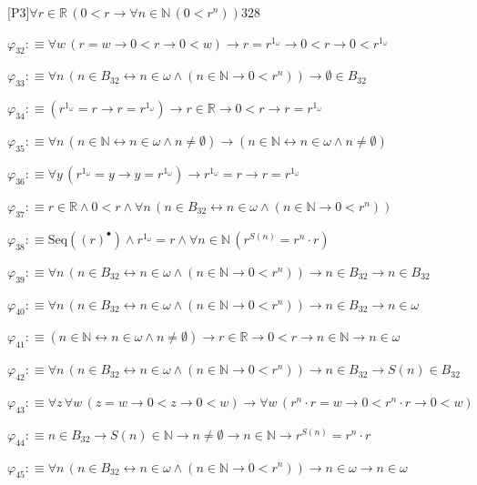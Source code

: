 \begin{fullproof}{[P3]}{$\forall r \in \mathbb{R}\,(0 < r \to \forall n \in \mathbb{N}\,(0 < {{r}^{n}}))$}{328}
\begin{abbrevlist}
\item $\varphi_{32} :\equiv \forall w\,(r = w \to 0 < r \to 0 < w) \to r = {{r}^{1_{\omega}}} \to 0 < r \to 0 < {{r}^{1_{\omega}}}$
\item $\varphi_{33} :\equiv \forall n\,(n \in B_{32} \leftrightarrow n \in \omega \land (n \in \mathbb{N} \to 0 < {{r}^{n}})) \to \emptyset \in B_{32}$
\item $\varphi_{34} :\equiv ({{r}^{1_{\omega}}} = r \to r = {{r}^{1_{\omega}}}) \to r \in \mathbb{R} \to 0 < r \to r = {{r}^{1_{\omega}}}$
\item $\varphi_{35} :\equiv \forall n\,(n \in \mathbb{N} \leftrightarrow n \in \omega \land n \neq \emptyset) \to (n \in \mathbb{N} \leftrightarrow n \in \omega \land n \neq \emptyset)$
\item $\varphi_{36} :\equiv \forall y\,({{r}^{1_{\omega}}} = y \to y = {{r}^{1_{\omega}}}) \to {{r}^{1_{\omega}}} = r \to r = {{r}^{1_{\omega}}}$
\item $\varphi_{37} :\equiv r \in \mathbb{R} \land 0 < r \land \forall n\,(n \in B_{32} \leftrightarrow n \in \omega \land (n \in \mathbb{N} \to 0 < {{r}^{n}}))$
\item $\varphi_{38} :\equiv \mathrm{Seq}({(r)^{\bullet}}) \land {{r}^{1_{\omega}}} = r \land \forall n \in \mathbb{N}\,({{r}^{S(n)}} = {{r}^{n}} \cdot r)$
\item $\varphi_{39} :\equiv \forall n\,(n \in B_{32} \leftrightarrow n \in \omega \land (n \in \mathbb{N} \to 0 < {{r}^{n}})) \to n \in B_{32} \to n \in B_{32}$
\item $\varphi_{40} :\equiv \forall n\,(n \in B_{32} \leftrightarrow n \in \omega \land (n \in \mathbb{N} \to 0 < {{r}^{n}})) \to n \in B_{32} \to n \in \omega$
\item $\varphi_{41} :\equiv (n \in \mathbb{N} \leftrightarrow n \in \omega \land n \neq \emptyset) \to r \in \mathbb{R} \to 0 < r \to n \in \mathbb{N} \to n \in \omega$
\item $\varphi_{42} :\equiv \forall n\,(n \in B_{32} \leftrightarrow n \in \omega \land (n \in \mathbb{N} \to 0 < {{r}^{n}})) \to n \in B_{32} \to S(n) \in B_{32}$
\item $\varphi_{43} :\equiv \forall z\,\forall w\,(z = w \to 0 < z \to 0 < w) \to \forall w\,({{r}^{n}} \cdot r = w \to 0 < {{r}^{n}} \cdot r \to 0 < w)$
\item $\varphi_{44} :\equiv n \in B_{32} \to S(n) \in \mathbb{N} \to n \neq \emptyset \to n \in \mathbb{N} \to {{r}^{S(n)}} = {{r}^{n}} \cdot r$
\item $\varphi_{45} :\equiv \forall n\,(n \in B_{32} \leftrightarrow n \in \omega \land (n \in \mathbb{N} \to 0 < {{r}^{n}})) \to n \in \omega \to n \in \omega$

\end{abbrevlist}
\end{fullproof}

